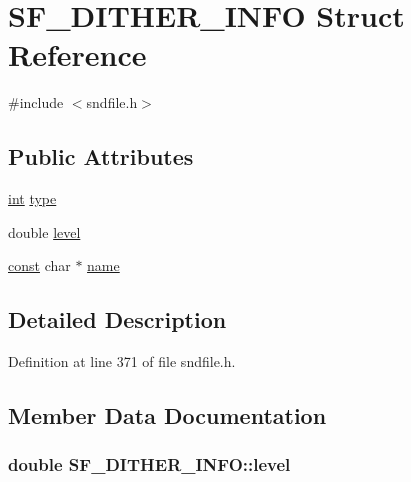 \hypertarget{struct_s_f___d_i_t_h_e_r___i_n_f_o}{}\section{S\+F\+\_\+\+D\+I\+T\+H\+E\+R\+\_\+\+I\+N\+FO Struct Reference}
\label{struct_s_f___d_i_t_h_e_r___i_n_f_o}


{\ttfamily \#include $<$sndfile.\+h$>$}

\subsection*{Public Attributes}
\begin{DoxyCompactItemize}
\item 
\hyperlink{xmltok_8h_a5a0d4a5641ce434f1d23533f2b2e6653}{int} \hyperlink{struct_s_f___d_i_t_h_e_r___i_n_f_o_aa2c525816e397993af8b95c0d4c7c69d}{type}
\item 
double \hyperlink{struct_s_f___d_i_t_h_e_r___i_n_f_o_ab2103a4159cf90c75df76318eaa5eb7f}{level}
\item 
\hyperlink{getopt1_8c_a2c212835823e3c54a8ab6d95c652660e}{const} char $\ast$ \hyperlink{struct_s_f___d_i_t_h_e_r___i_n_f_o_acf7cbe5faa3a5fe1fdff24ad8feeb995}{name}
\end{DoxyCompactItemize}


\subsection{Detailed Description}


Definition at line 371 of file sndfile.\+h.



\subsection{Member Data Documentation}
\subsubsection[{\texorpdfstring{level}{level}}]{\setlength{\rightskip}{0pt plus 5cm}double S\+F\+\_\+\+D\+I\+T\+H\+E\+R\+\_\+\+I\+N\+F\+O\+::level}\hypertarget{struct_s_f___d_i_t_h_e_r___i_n_f_o_ab2103a4159cf90c75df76318eaa5eb7f}{}\label{struct_s_f___d_i_t_h_e_r___i_n_f_o_ab2103a4159cf90c75df76318eaa5eb7f}


